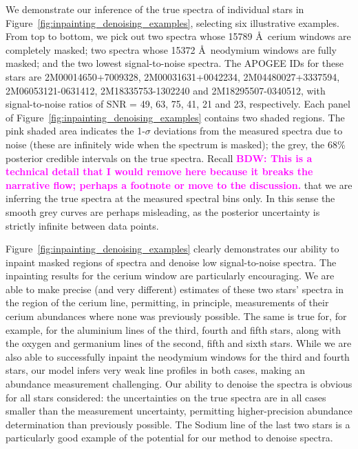\documentclass[a4paper,fleqn,usenatbib]{mnras}
\newcommand{\bdw}[1]{\textbf{\textcolor{magenta}{BDW: #1}}}
\begin{document}
We demonstrate our inference of the true spectra of individual stars in Figure~\ref{fig:inpainting_denoising_examples}, selecting six illustrative examples. From top to bottom, we pick out two spectra whose 15789 \AA\ cerium windows are completely masked; two spectra whose 15372 \AA\ neodymium windows are fully masked; and the two lowest signal-to-noise spectra. The APOGEE IDs for these stars are 2M00014650+7009328, 2M00031631+0042234, 2M04480027+3337594, 2M06053121-0631412, 2M18335753-1302240 and 2M18295507-0340512, with signal-to-noise ratios of SNR = 49, 63, 75, 41, 21 and 23, respectively. Each panel of Figure~\ref{fig:inpainting_denoising_examples} contains two shaded regions. The pink shaded area indicates the 1-$\sigma$ deviations from the measured spectra due to noise (these are infinitely wide when the spectrum is masked); the grey, the 68\% posterior credible intervals on the true spectra. Recall \bdw{This is a technical detail that I would remove here because it breaks the narrative flow; perhaps a footnote or move to the discussion.} that we are inferring the true spectra at the measured spectral bins only. In this sense the smooth grey curves are perhaps misleading, as the posterior uncertainty is strictly infinite between data points.

Figure~\ref{fig:inpainting_denoising_examples} clearly demonstrates our ability to inpaint masked regions of spectra and denoise low signal-to-noise spectra. The inpainting results for the cerium window are particularly encouraging. We are able to make precise (and very different) estimates of these two stars' spectra in the region of the cerium line, permitting, in principle, measurements of their cerium abundances where none was previously possible. The same is true for, for example, for the aluminium lines of the third, fourth and fifth stars, along with the oxygen and germanium lines of the second, fifth and sixth stars. While we are also able to successfully inpaint the neodymium windows for the third and fourth stars, our model infers very weak line profiles in both cases, making an abundance measurement challenging. Our ability to denoise the spectra is obvious for all stars considered: the uncertainties on the true spectra are in all cases smaller than the measurement uncertainty, permitting higher-precision abundance determination than previously possible. The Sodium line of the last two stars is a particularly good example of the potential for our method to denoise spectra.
\end{document}
